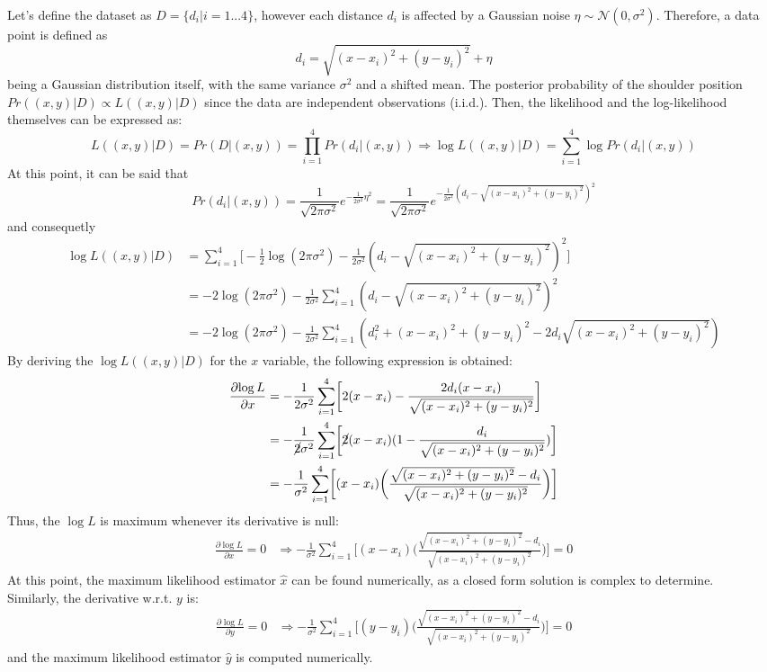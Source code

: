 \Answer[number={2}]
Let's define the dataset as \(D=\{d_i | i=1...4\}\),
however each distance \(d_i\) is affected by a Gaussian
noise \(\eta\sim\mathcal{N}(0,\sigma^2)\).
Therefore, a data point is defined as
\[d_i = \sqrt{(x-x_i)^2+(y-y_i)^2} + \eta\]
being a Gaussian distribution itself, with the same variance \(\sigma^2\)
and a shifted mean.
The posterior probability of the shoulder position
\(Pr((x,y)|D)\propto L((x,y)|D)\) since the data are independent
observations (i.i.d.).
Then, the likelihood and the log-likelihood themselves can be expressed as:
\[
    L((x,y)|D) = Pr(D|(x,y)) = \prod_{i=1}^{4} Pr(d_i|(x,y))
    \Rightarrow
    \log{L}((x,y)|D) = \sum_{i=1}^{4}\log{Pr(d_i|(x,y))}
\]
At this point, it can be said that
\[
    Pr(d_i|(x,y)) = 
    \frac{1}{\sqrt{2\pi\sigma^2}}e^{-\frac{1}{2\sigma^2}\eta^2} =
    \frac{1}{\sqrt{2\pi\sigma^2}}e^{-\frac{1}{2\sigma^2}(d_i-\sqrt{(x-x_i)^2+(y-y_i)^2})^2}
\]
and consequetly
\begin{align*}
    \log{L}((x,y)|D)
    &=
    \sum_{i=1}^{4} \biggl[-\frac{1}{2}\log{(2\pi\sigma^2)} -\frac{1}{2\sigma^2}(d_i-\sqrt{(x-x_i)^2+(y-y_i)^2})^2\biggr] \\
    &=
    -2\log{(2\pi\sigma^2)} -\frac{1}{2\sigma^2}\sum_{i=1}^{4} (d_i-\sqrt{(x-x_i)^2+(y-y_i)^2})^2 \\
    &=
    -2\log{(2\pi\sigma^2)} -\frac{1}{2\sigma^2}\sum_{i=1}^{4} (d_i^2 + (x-x_i)^2+(y-y_i)^2 - 2d_i\sqrt{(x-x_i)^2+(y-y_i)^2})
\end{align*}
By deriving the \(\log{L}((x,y)|D)\) for the \(x\) variable, the following
expression is obtained:
\begin{align*}
    \frac{\partial{\log{L}}}{\partial{x}}
    &=
    -\frac{1}{2\sigma^2}\sum_{i=1}^{4} \biggl[2(x-x_i) - \frac{2d_i(x-x_i)}{\sqrt{(x-x_i)^2+(y-y_i)^2}}\biggr] \\
    &=
    -\frac{1}{\cancel{2}\sigma^2}\sum_{i=1}^{4} \biggl[\cancel{2}(x-x_i)( 1-\frac{d_i}{\sqrt{(x-x_i)^2+(y-y_i)^2}})\biggr] \\
    &=
    -\frac{1}{\sigma^2}\sum_{i=1}^{4} \biggl[(x-x_i)\biggl(\frac{\sqrt{(x-x_i)^2+(y-y_i)^2}-d_i}{\sqrt{(x-x_i)^2+(y-y_i)^2}}\biggr)\biggr] \\
\end{align*}
Thus, the \(\log{L}\) is maximum whenever its derivative is null:
\begin{align*}
    \frac{\partial{\log{L}}}{\partial{x}}
    =
    0
    &\Rightarrow
    -\frac{1}{\sigma^2}\sum_{i=1}^{4} \biggl[(x-x_i)\biggl(\frac{\sqrt{(x-x_i)^2+(y-y_i)^2}-d_i}{\sqrt{(x-x_i)^2+(y-y_i)^2}}\biggr)\biggr]
    =
    0
\end{align*}
At this point, the maximum likelihood estimator \(\hat{x}\) can be found
numerically, as a closed form solution is complex to determine. \\
Similarly, the derivative w.r.t. \(y\) is:
\begin{align*}
    \frac{\partial{\log{L}}}{\partial{y}}
    =
    0
    &\Rightarrow
    -\frac{1}{\sigma^2}\sum_{i=1}^{4} \biggl[(y-y_i)\biggl(\frac{\sqrt{(x-x_i)^2+(y-y_i)^2}-d_i}{\sqrt{(x-x_i)^2+(y-y_i)^2}}\biggr)\biggr]
    =
    0
\end{align*}
and the maximum likelihood estimator \(\hat{y}\) is computed numerically.